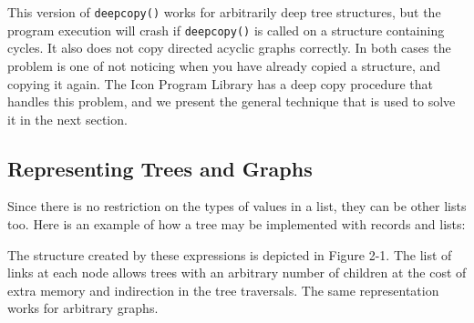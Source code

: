
This version of \texttt{deepcopy()} works for
arbitrarily deep tree structures, but the program execution
will crash if \texttt{deepcopy()} is called on a structure containing
cycles. It also does not copy directed acyclic graphs correctly. In
both cases the problem is one of not noticing when you have already
copied a structure, and copying it again. The Icon Program Library has
a deep copy procedure that handles this problem, and we present the
general technique that is used to solve it in the next section.

\subsection*{Representing Trees and Graphs}

Since there is no restriction on the types of values in a list, they can
be other lists too. Here is an example of how a tree may be implemented
with records and lists:


The structure created by these expressions is depicted in Figure 2-1.
The list of links at each node allows trees with an arbitrary number of
children at the cost of extra memory and indirection in the tree
traversals. The same representation works for arbitrary
graphs.




